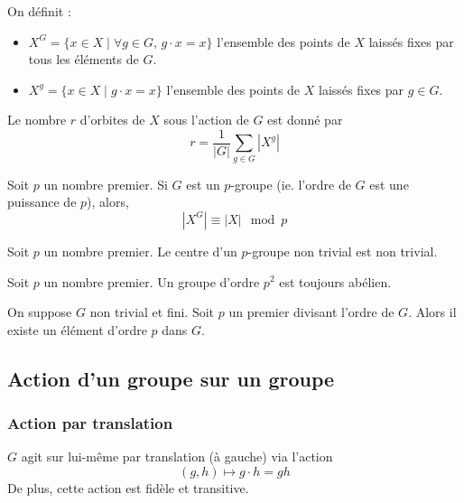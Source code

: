 	\begin{definition}
		On définit :
		\begin{itemize}
			\item $X^G = \{ x \in X \mid \forall g \in G, \, g \cdot x = x \}$ l'ensemble des points de $X$ laissés fixes par tous les éléments de $G$.
			\item $X^g = \{ x \in X \mid g \cdot x = x \}$ l'ensemble des points de $X$ laissés fixes par $g \in G$.
		\end{itemize}
	\end{definition}

	\begin{theorem}
		Le nombre $r$ d'orbites de $X$ sous l'action de $G$ est donné par
		\[ r = \frac{1}{|G|} \sum_{g \in G} |X^g| \]
	\end{theorem}

	\begin{corollary}
		Soit $p$ un nombre premier. Si $G$ est un $p$-groupe (ie. l'ordre de $G$ est une puissance de $p$), alors,
		\[ |X^G| \equiv |X| \mod p \]
	\end{corollary}

	\begin{corollary}
		Soit $p$ un nombre premier. Le centre d'un $p$-groupe non trivial est non trivial.
	\end{corollary}

	\begin{corollary}
		Soit $p$ un nombre premier. Un groupe d'ordre $p^2$ est toujours abélien.
	\end{corollary}

	\begin{application}
  	On suppose $G$ non trivial et fini. Soit $p$ un premier divisant l'ordre de $G$. Alors il existe un élément d'ordre $p$ dans $G$.
  \end{application}

	\newpage
	\subsection{Action d'un groupe sur un groupe}

	\subsubsection{Action par translation}


	\begin{proposition}
		$G$ agit sur lui-même par translation (à gauche) via l'action
		\[ (g, h) \mapsto g \cdot h = gh \]
		De plus, cette action est fidèle et transitive.
	\end{proposition}

